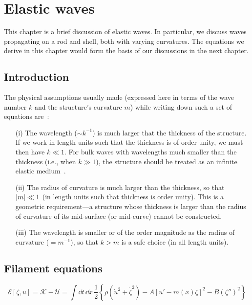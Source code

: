 
\chapter{Elastic waves}

This chapter is a brief discussion of elastic waves.
In particular, we discuss waves propagating on a rod and shell, both with varying curvatures.
The equations we derive in this chapter would form the basis of our discussions in the next chapter.

\section{Introduction}

The physical assumptions usually made (expressed here in terms of the wave number $k$ and the structure's curvature $m$) while writing down such a set of equations are~\cite{pierce1993,norris1994,kernes2021}:
%
\begin{enumerate}
  \setlength\itemsep{0em}
  \item[(i)] The wavelength ($\sim k^{-1}$) is much larger that the thickness of the structure.
    If we work in length units such that the thickness is of order unity, we must then have $k \ll 1$.
    For bulk waves with wavelengths much smaller than the thickness (i.e., when $k \gg 1$), the structure should be treated as an infinite elastic medium~\cite{landau1986}.
  \item[(ii)] The radius of curvature is much larger than the thickness, so that $\lvert m\rvert \ll 1$ (in length units such that thickness is order unity).
    This is a geometric requirement---a structure whose thickness is larger than the radius of curvature of its mid-surface (or mid-curve) cannot be constructed.
  \item[(iii)] The wavelength is smaller or of the order magnitude as the radius of curvature ($= m^{-1}$), so that $k > m$ is a safe choice (in all length units).
\end{enumerate}

\section{Filament equations}

%
\begin{equation}
  \mathscr{E}[\zeta, u] = \mathscr{K} - \mathscr{U} = \int \dd{t}\,\dd{x}\,\frac{1}{2}\left\{\rho\left(\dot{u}^{2} + \dot{\zeta}^{2}\right) - A\left[u' - m(x)\zeta\right]^{2} - B\left(\zeta''\right)^{2}\right\}
\end{equation}

